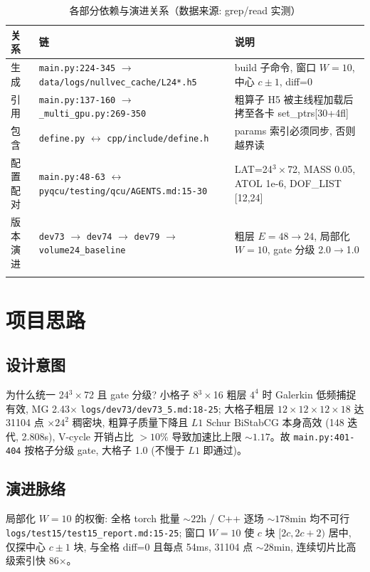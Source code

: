 \documentclass[UTF8]{ctexart}
\begin{document}
\begin{xltabular}{\textwidth}{llX}
\toprule
关系 & 链 & 说明 \\
\midrule
\endhead
生成 & \texttt{\nolinkurl{main.py:224-345}} $\to$ \texttt{\nolinkurl{data/logs/nullvec_cache/L24*.h5}} & build 子命令, 窗口 $W=10$, 中心 $c\pm1$, diff=0 \\
引用 & \texttt{\nolinkurl{main.py:137-160}} $\to$ \texttt{\nolinkurl{_multi_gpu.py:269-350}} & 粗算子 H5 被主线程加载后拷至各卡 set\_ptrs[30+4fl] \\
包含 & \texttt{\nolinkurl{define.py}} $\leftrightarrow$ \texttt{\nolinkurl{cpp/include/define.h}} & params 索引必须同步, 否则越界读 \\
配置配对 & \texttt{\nolinkurl{main.py:48-63}} $\leftrightarrow$ \texttt{\nolinkurl{pyqcu/testing/qcu/AGENTS.md:15-30}} & LAT=24$^3\times$72, MASS 0.05, ATOL 1e-6, DOF\_LIST [12,24] \\
版本演进 & \texttt{\nolinkurl{dev73}} $\to$ \texttt{\nolinkurl{dev74}} $\to$ \texttt{\nolinkurl{dev79}} $\to$ \texttt{\nolinkurl{volume24_baseline}} & 粗层 $E=48\to24$, 局部化 $W=10$, gate 分级 2.0$\to$1.0 \\
\bottomrule
\caption{各部分依赖与演进关系（数据来源: grep/read 实测）}
\end{xltabular}

\section{项目思路}
\subsection{设计意图}
\textcolor{idea}{为什么统一 24$^3\times$72 且 gate 分级?} 小格子 8$^3\times$16 粗层 $4^4$ 时 Galerkin 低频捕捉有效, MG 2.43$\times$ \textcolor{evidence}{\texttt{\nolinkurl{logs/dev73/dev73_5.md:18-25}}}; 大格子粗层 $12\times12\times12\times18$ 达 31104 点 $\times 24^2$ 稠密块, 粗算子质量下降且 $L1$ Schur BiStabCG 本身高效 (148 迭代, 2.808s), V-cycle 开销占比 $>10\%$ 导致加速比上限 $\sim1.17$。故 \texttt{\nolinkurl{main.py:401-404}} 按格子分级 gate, 大格子 1.0 (不慢于 $L1$ 即通过)。

\subsection{演进脉络}
\textcolor{idea}{局部化 $W=10$ 的权衡:} 全格 torch 批量 $\sim22$h / C++ 逐场 $\sim178$min 均不可行 \textcolor{evidence}{\texttt{\nolinkurl{logs/test15/test15_report.md:15-25}}}; 窗口 $W=10$ 使 $c$ 块 $[2c,2c+2)$ 居中, 仅探中心 $c\pm1$ 块, 与全格 diff=0 且每点 54ms, 31104 点 $\sim28$min, 连续切片比高级索引快 86$\times$。
\end{document}

